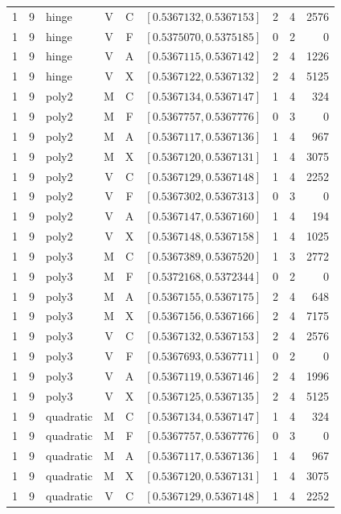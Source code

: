 \begin{longtable}{r r l c c l r r r}
1 & 9 & hinge & V & C & $[0.5367132,0.5367153]$ & 2 & 4 & 2576 \\
1 & 9 & hinge & V & F & $[0.5375070,0.5375185]$ & 0 & 2 & 0 \\
1 & 9 & hinge & V & A & $[0.5367115,0.5367142]$ & 2 & 4 & 1226 \\
1 & 9 & hinge & V & X & $[0.5367122,0.5367132]$ & 2 & 4 & 5125 \\
1 & 9 & poly2 & M & C & $[0.5367134,0.5367147]$ & 1 & 4 & 324 \\
1 & 9 & poly2 & M & F & $[0.5367757,0.5367776]$ & 0 & 3 & 0 \\
1 & 9 & poly2 & M & A & $[0.5367117,0.5367136]$ & 1 & 4 & 967 \\
1 & 9 & poly2 & M & X & $[0.5367120,0.5367131]$ & 1 & 4 & 3075 \\
1 & 9 & poly2 & V & C & $[0.5367129,0.5367148]$ & 1 & 4 & 2252 \\
1 & 9 & poly2 & V & F & $[0.5367302,0.5367313]$ & 0 & 3 & 0 \\
1 & 9 & poly2 & V & A & $[0.5367147,0.5367160]$ & 1 & 4 & 194 \\
1 & 9 & poly2 & V & X & $[0.5367148,0.5367158]$ & 1 & 4 & 1025 \\
1 & 9 & poly3 & M & C & $[0.5367389,0.5367520]$ & 1 & 3 & 2772 \\
1 & 9 & poly3 & M & F & $[0.5372168,0.5372344]$ & 0 & 2 & 0 \\
1 & 9 & poly3 & M & A & $[0.5367155,0.5367175]$ & 2 & 4 & 648 \\
1 & 9 & poly3 & M & X & $[0.5367156,0.5367166]$ & 2 & 4 & 7175 \\
1 & 9 & poly3 & V & C & $[0.5367132,0.5367153]$ & 2 & 4 & 2576 \\
1 & 9 & poly3 & V & F & $[0.5367693,0.5367711]$ & 0 & 2 & 0 \\
1 & 9 & poly3 & V & A & $[0.5367119,0.5367146]$ & 2 & 4 & 1996 \\
1 & 9 & poly3 & V & X & $[0.5367125,0.5367135]$ & 2 & 4 & 5125 \\
1 & 9 & quadratic & M & C & $[0.5367134,0.5367147]$ & 1 & 4 & 324 \\
1 & 9 & quadratic & M & F & $[0.5367757,0.5367776]$ & 0 & 3 & 0 \\
1 & 9 & quadratic & M & A & $[0.5367117,0.5367136]$ & 1 & 4 & 967 \\
1 & 9 & quadratic & M & X & $[0.5367120,0.5367131]$ & 1 & 4 & 3075 \\
1 & 9 & quadratic & V & C & $[0.5367129,0.5367148]$ & 1 & 4 & 2252 \\

\end{longtable}
